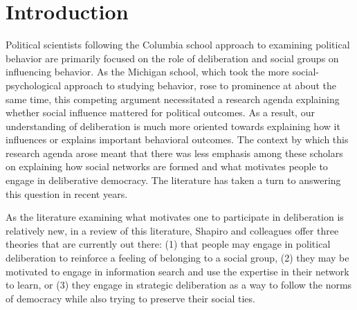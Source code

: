 \documentclass[12pt]{article}
\begin{document}

\cfoot{\thepage}

\doublespacing

\section{Introduction}

Political scientists following the Columbia school approach to examining political behavior are primarily focused on the role of deliberation and social groups on influencing behavior. As the Michigan school, which took the more social-psychological approach to studying behavior, rose to prominence at about the same time, this competing argument necessitated a research agenda explaining whether social influence mattered for political outcomes. As a result, our understanding of deliberation is much more oriented towards explaining how it influences or explains important behavioral outcomes. The context by which this research agenda arose meant that there was less emphasis among these scholars on explaining how social networks are formed and what motivates people to engage in deliberative democracy. The literature has taken a turn to answering this question in recent years.

As the literature examining what motivates one to participate in deliberation is relatively new, in a review of this literature, Shapiro and colleagues \citeyearpar{shapiro_et-al_2020_oh} offer three theories that are currently out there: (1) that people may engage in political deliberation to reinforce a feeling of belonging to a social group, (2) they may be motivated to engage in information search and use the expertise in their network to learn, or (3) they engage in strategic deliberation as a way to follow the norms of democracy while also trying to preserve their social ties. 
\end{document}
